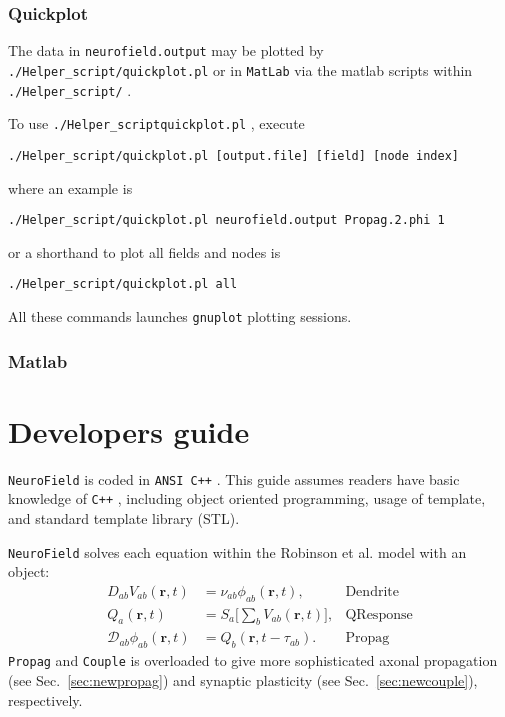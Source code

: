 \documentclass[12pt,a4paper]{article}
\newcommand{\type}[1]{ {\small\small\tt #1} }
\begin{document}
\subsubsection{Quickplot}

The data in \type{neurofield.output} may be plotted by \type{./Helper\_script/quickplot.pl} or in \type{MatLab} via the matlab scripts within \type{./Helper\_script/}.

To use \type{./Helper\_script\/quickplot.pl}, execute
\begin{lstlisting}
./Helper_script/quickplot.pl [output.file] [field] [node index]
\end{lstlisting}
where an example is
\begin{lstlisting}
./Helper_script/quickplot.pl neurofield.output Propag.2.phi 1
\end{lstlisting}
or a shorthand to plot all fields and nodes is
\begin{lstlisting}
./Helper_script/quickplot.pl all
\end{lstlisting}
All these commands launches \type{gnuplot} plotting sessions.

\subsubsection{Matlab}

\pagebreak
\section{Developers guide}

\type{NeuroField} is coded in \type{ANSI C++}. This guide assumes readers have basic knowledge of \type{C++}, including object oriented programming, usage of template, and standard template library (STL). %

\type{NeuroField} solves each equation within the Robinson et al. model with an object:
\begin{align*}
	D_{ab}V_{ab}(\mathbf{r},t) &= \nu_{ab}\phi_{ab}(\mathbf{r},t), & \mathrm{Dendrite}\\
					  Q_a(\mathbf{r},t) &= S_a \big[\sum_b V_{ab}(\mathbf{r},t) \big], & \mathrm{QResponse}\\
	\mathcal{D}_{ab}\phi_{ab}(\mathbf{r},t) &= Q_b(\mathbf{r},t-\tau_{ab}).&  \mathrm{Propag}
\end{align*}
\type{Propag} and \type{Couple} is overloaded to give more sophisticated axonal propagation (see Sec.~\ref{sec:newpropag}) and synaptic plasticity (see Sec.~\ref{sec:newcouple}), respectively.
\end{document}
